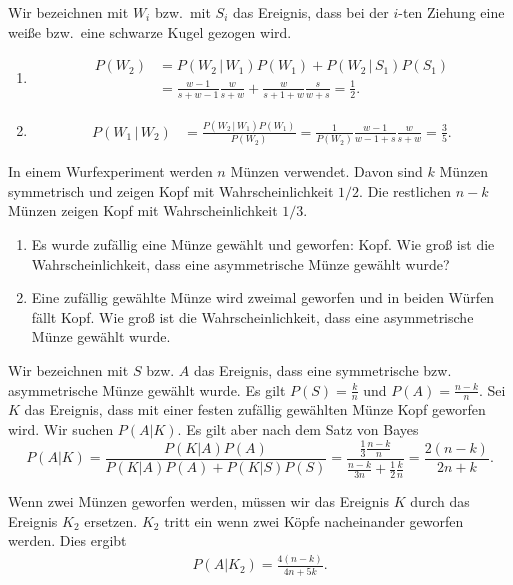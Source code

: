 \solution
Wir bezeichnen mit $W_i$ bzw.\ mit $S_i$ das Ereignis, dass bei der $i$-ten
Ziehung eine weiße bzw.\ eine schwarze Kugel gezogen wird.
\begin{enumerate}
    \item \begin{align*}
            P(W_2) &= P(W_2 \,|\, W_1)P(W_1) + P(W_2 \,|\, S_1)P(S_1) \\
            &= \frac{w-1}{s+w-1} \frac{w}{s+w} + \frac{w}{s+1+w} \frac{s}{w+s} = \frac{1}{2}. 
        \end{align*}
    \item \begin{align*}
            P( W_1 \,|\, W_2 ) &= \frac{P(W_2 \,|\, W_1) P(W_1)}{P(W_2)} = 
            \frac{1}{P(W_2)} \frac{ w-1 }{w-1+s}\frac{w}{s+w} = \frac{3}{5}. 
        \end{align*}
\end{enumerate}



In einem Wurfexperiment werden $n$ Münzen verwendet. Davon sind $k$ Münzen
symmetrisch und zeigen Kopf mit Wahrscheinlichkeit $1/2$. Die restlichen $n-k$
Münzen zeigen Kopf mit Wahrscheinlichkeit $1/3$. 
\begin{enumerate}
    \item Es wurde zufällig eine Münze gewählt und geworfen: Kopf. Wie groß ist 
        die Wahrscheinlichkeit, dass eine asymmetrische Münze gewählt wurde?
    \item Eine zufällig gewählte Münze wird zweimal geworfen und in beiden 
        Würfen fällt Kopf. Wie groß ist die Wahrscheinlichkeit, dass eine asymmetrische
        Münze gewählt wurde. 
\end{enumerate}

\solution Wir bezeichnen mit $S$ bzw. $A$ das Ereignis, dass eine
symmetrische bzw. asymmetrische Münze gewählt wurde. Es gilt $P(S) = \frac{k}{n}$
und $P(A)=\frac{n-k}{n}$. Sei $K$ das Ereignis, dass mit einer festen zufällig
gewählten Münze Kopf geworfen wird. Wir suchen $P(A | K)$. Es gilt aber nach dem
Satz von Bayes
\begin{equation*}
    P( A | K) = \frac{ P( K | A) P(A) }{ P(K | A) P(A) + P(K | S) P(S) }
    = \frac{\frac{1}{3} \frac{n-k}{n} }{ \frac{n-k}{3 n} + \frac{1}{2} \frac{k}{n}} 
    = \frac{2(n-k)}{2n + k}.
\end{equation*}

Wenn zwei Münzen geworfen werden, müssen wir das Ereignis $K$ durch das Ereignis $K_2$ ersetzen. 
$K_2$ tritt ein wenn zwei Köpfe nacheinander geworfen werden. Dies ergibt
\begin{align*}
    P\left( A | K_{2} \right) = \frac{4(n-k)}{4n + 5k}. 
\end{align*}




